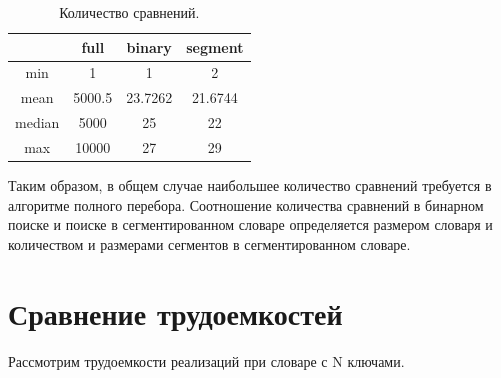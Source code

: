 \begin{table}[h!]
	\begin{center}
		\begin{tabular}{|c | c | c | c |}
			\hline
			 & full & binary & segment \\
			\hline
			min & 1 & 1 & 2 \\
			mean & 5000.5 & 23.7262 & 21.6744 \\
			median & 5000 & 25 & 22 \\
			max & 10000 & 27 & 29 \\
			\hline
		\end{tabular}
	\end{center}
	\caption{\label{tab:cmp} Количество сравнений.}
\end{table}



Таким образом, в общем случае наибольшее количество сравнений требуется в алгоритме полного перебора. Соотношение количества сравнений в бинарном поиске и поиске в сегментированном словаре определяется размером словаря и количеством и размерами сегментов в сегментированном словаре.

\clearpage
\section{Сравнение трудоемкостей}

Рассмотрим трудоемкости реализаций при словаре с N ключами.

